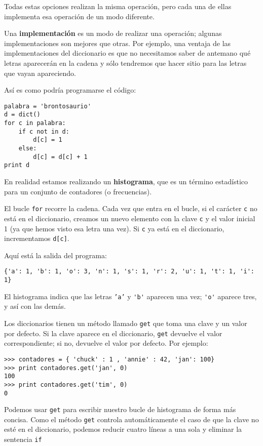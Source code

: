 Todas estas opciones realizan la misma operación, pero cada
una de ellas implementa esa operación de un modo diferente.


Una {\bf implementación} es un modo de realizar una operación;
algunas implementaciones son mejores que otras. Por ejemplo,
una ventaja de las implementaciones del diccionario es que no
necesitamos saber de antemano qué letras aparecerán en la cadena
y sólo tendremos que hacer sitio para las letras que vayan apareciendo.

Así es como podría programarse el código:

\beforeverb
\begin{verbatim}
palabra = 'brontosaurio'
d = dict()
for c in palabra:
    if c not in d:
        d[c] = 1
    else:
        d[c] = d[c] + 1
print d
\end{verbatim}
\afterverb
%
En realidad estamos realizando un {\bf histograma}, que es un término
estadístico para un conjunto de contadores (o frecuencias).


El bucle {\tt for} recorre
la cadena. Cada vez que entra en el bucle, si el carácter {\tt c} no
está en el diccionario, creamos un nuevo elemento con la clave {\tt c} y el
valor inicial 1 (ya que hemos visto esa letra una vez). Si {\tt c} ya
está en el diccionario, incrementamos {\tt d[c]}.

Aquí está la salida del programa:

\beforeverb
\begin{verbatim}
{'a': 1, 'b': 1, 'o': 3, 'n': 1, 's': 1, 'r': 2, 'u': 1, 't': 1, 'i': 1}
\end{verbatim}
\afterverb
%
El histograma indica que las letras {\tt 'a'} y \verb"'b'"
aparecen una vez;  \verb"'o'" aparece tres, y así con las demás.


Los diccionarios tienen un método llamado {\tt get} que toma una clave
y un valor por defecto. Si la clave aparece en el diccionario,
{\tt get} devuelve el valor correspondiente; si no, devuelve
el valor por defecto. Por ejemplo:

\beforeverb
\begin{verbatim}
>>> contadores = { 'chuck' : 1 , 'annie' : 42, 'jan': 100}
>>> print contadores.get('jan', 0)
100
>>> print contadores.get('tim', 0)
0
\end{verbatim}
\afterverb
%
Podemos usar {\tt get} para escribir nuestro bucle de histograma de forma más concisa.
Como el método {\tt get} controla automáticamente el caso de que la clave
no esté en el diccionario, podemos reducir cuatro líneas a una sola
y eliminar la sentencia {\tt if}


